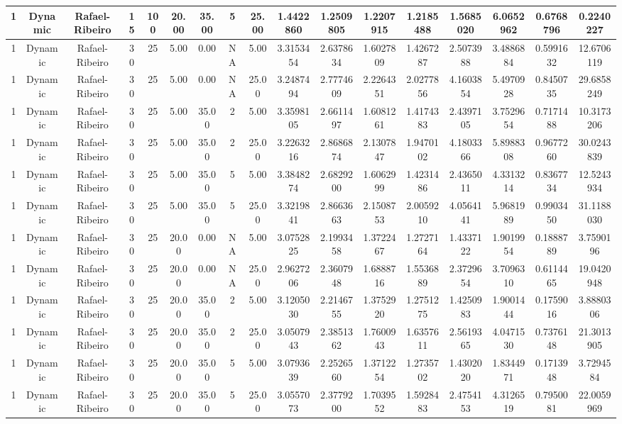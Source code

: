 \begin{longtable}{ | c | c | c | c | c | c | c | c | c | c | c | c | c | c | c | c | c | }
	\hline
	1	&	Dynamic	&	Rafael-Ribeiro	&	15	&	100	&	20.00	&	35.00	&	5	&	25.00	&	1.4422860	&	1.2509805	&	1.2207915	&	1.2185488	&	1.5685020	&	6.0652962	&	0.6768796	&	0.2240227 \\
	\hline
	1	&	Dynamic	&	Rafael-Ribeiro	&	30	&	25	&	5.00	&	0.00	&	NA	&	5.00	&	3.3153454	&	2.6378634	&	1.6027809	&	1.4267287	&	2.5073988	&	3.4886884	&	0.5991632	&	12.6706119 \\
	\hline
	1	&	Dynamic	&	Rafael-Ribeiro	&	30	&	25	&	5.00	&	0.00	&	NA	&	25.00	&	3.2487494	&	2.7774609	&	2.2264351	&	2.0277856	&	4.1603854	&	5.4970928	&	0.8450735	&	29.6858249 \\
	\hline
	1	&	Dynamic	&	Rafael-Ribeiro	&	30	&	25	&	5.00	&	35.00	&	2	&	5.00	&	3.3598105	&	2.6611497	&	1.6081261	&	1.4174383	&	2.4397105	&	3.7529654	&	0.7171488	&	10.3173206 \\
	\hline
	1	&	Dynamic	&	Rafael-Ribeiro	&	30	&	25	&	5.00	&	35.00	&	2	&	25.00	&	3.2263216	&	2.8686874	&	2.1307847	&	1.9470102	&	4.1803366	&	5.8988308	&	0.9677260	&	30.0243839 \\
	\hline
	1	&	Dynamic	&	Rafael-Ribeiro	&	30	&	25	&	5.00	&	35.00	&	5	&	5.00	&	3.3848274	&	2.6829200	&	1.6062999	&	1.4231486	&	2.4365011	&	4.3313214	&	0.8367734	&	12.5243934 \\
	\hline
	1	&	Dynamic	&	Rafael-Ribeiro	&	30	&	25	&	5.00	&	35.00	&	5	&	25.00	&	3.3219841	&	2.8663663	&	2.1508753	&	2.0059210	&	4.0564141	&	5.9681989	&	0.9903450	&	31.1188030 \\
	\hline
	1	&	Dynamic	&	Rafael-Ribeiro	&	30	&	25	&	20.00	&	0.00	&	NA	&	5.00	&	3.0752825	&	2.1993458	&	1.3722467	&	1.2727164	&	1.4337122	&	1.9019954	&	0.1888789	&	3.7590196 \\
	\hline
	1	&	Dynamic	&	Rafael-Ribeiro	&	30	&	25	&	20.00	&	0.00	&	NA	&	25.00	&	2.9627206	&	2.3607948	&	1.6888716	&	1.5536889	&	2.3729654	&	3.7096310	&	0.6114465	&	19.0420948 \\
	\hline
	1	&	Dynamic	&	Rafael-Ribeiro	&	30	&	25	&	20.00	&	35.00	&	2	&	5.00	&	3.1205030	&	2.2146755	&	1.3752920	&	1.2751275	&	1.4250983	&	1.9001444	&	0.1759016	&	3.8880306 \\
	\hline
	1	&	Dynamic	&	Rafael-Ribeiro	&	30	&	25	&	20.00	&	35.00	&	2	&	25.00	&	3.0507943	&	2.3851362	&	1.7600943	&	1.6357611	&	2.5619365	&	4.0471530	&	0.7376148	&	21.3013905 \\
	\hline
	1	&	Dynamic	&	Rafael-Ribeiro	&	30	&	25	&	20.00	&	35.00	&	5	&	5.00	&	3.0793639	&	2.2526560	&	1.3712254	&	1.2735702	&	1.4302020	&	1.8344971	&	0.1713948	&	3.7294584 \\
	\hline
	1	&	Dynamic	&	Rafael-Ribeiro	&	30	&	25	&	20.00	&	35.00	&	5	&	25.00	&	3.0557073	&	2.3779200	&	1.7039552	&	1.5928483	&	2.4754153	&	4.3126519	&	0.7950081	&	22.0059969 \\

\end{longtable}
